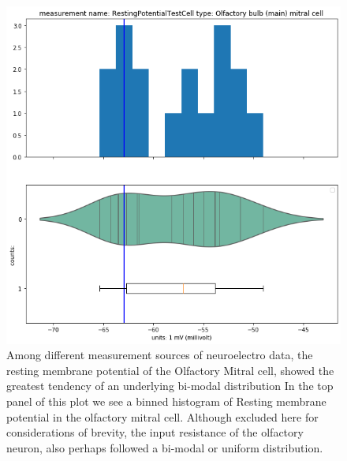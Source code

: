 \begin{figure}  
\begin{center}     
  \includegraphics[scale=0.8]{chapters/notebooks_converted/needata_thesis_files/needata_thesis_5_22}
      \caption{Among different measurement sources of neuroelectro data, the resting membrane potential of the Olfactory Mitral cell, showed the greatest tendency of an underlying bi-modal distribution
      In the top panel of this plot we see a binned histogram of Resting membrane potential in the olfactory mitral cell. Although excluded here for considerations of brevity, the input resistance of the olfactory neuron, also perhaps followed a bi-modal or uniform distribution. 
      }
      \label{fig:bimodal-feature}
\end{center}     
\end{figure}
%
    

